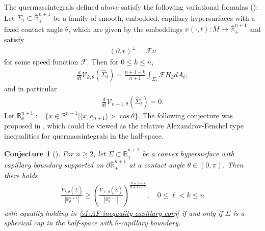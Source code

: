 \documentclass[11pt,reqno]{amsart}
\newtheorem{con}[thm]{Conjecture}
\theoremstyle{definition}
\theoremstyle{remark}
\numberwithin{equation}{section}
\renewcommand{\(}{\left(}
\renewcommand{\)}{\right)}
\renewcommand{\-}{\overline}
\renewcommand{\t}{\theta}
\newcommand{\ra}{\rightarrow}
\begin{document}
The quermassintegrals defined above satisfy the following variational formulas (\cite[Theorem 1.1]{Wang-Weng-Xia2022}): Let $\Sigma_t\subset \-{\mathbb R}^{n+1}_{+}$ be a family of smooth, embedded, capillary hypersurfaces with a fixed contact angle $\t$, which are given by the embeddings $x(\cdot,t):M\ra \-{\mathbb R}^{n+1}_{+}$ and satisfy
\begin{align*}
\(\partial_tx\)^\bot=\mathcal{F}\nu
\end{align*}
for some speed function $\mathcal{F}$. Then for $0\leq k\leq n$,
\begin{align}\label{s1:variation-formula}
\frac{d}{dt}\mathcal{V}_{k,\t}(\widehat{\Sigma}_t)=\frac{n+1-k}{n+1}\int_{\Sigma_t}\mathcal{F} H_k dA_t,
\end{align}
and in particular
\begin{align*}
\frac{d}{dt}\mathcal{V}_{n+1,\t}(\widehat{\Sigma}_t)=0.
\end{align*}
Let $\mathbb B_\t^{n+1}:=\{x\in \mathbb B^{n+1}| \langle x,e_{n+1}\rangle >\cos\t \}$. The following conjecture was proposed in \cite[Conjecture 1.5]{Wang-Weng-Xia2022}, which could be viewed as the relative Alexandrov-Fenchel type inequalities for quermassintegrals in the half-space.
\begin{con}[\cite{Wang-Weng-Xia2022}]\label{s1.Ques}
For $n\geq 2$, let $\Sigma\subset \-{\mathbb R}^{n+1}_{+}$ be a convex hypersurface with capillary boundary supported on $\partial\-{\mathbb R}_{+}^{n+1}$ at a contact angle $\theta\in (0,\pi)$. Then there holds
	\begin{align}\label{s1:AF-inequality-capillary-conj}
	\frac{\mathcal{V}_{k,\t}(\widehat{\Sigma})}{|\mathbb B_\t^{n+1}|} \geq \(\frac{\mathcal{V}_{\ell,\t}(\widehat{\Sigma})}{|\mathbb B_\t^{n+1}|}\)^\frac{n+1-k}{n+1-\ell}, \quad 0\leq \ell<k\leq n
	\end{align}
with equality holding in \eqref{s1:AF-inequality-capillary-conj} if and only if $\Sigma$ is a spherical cap  in the half-space with $\t$-capillary boundary.
\end{con}
\end{document}
